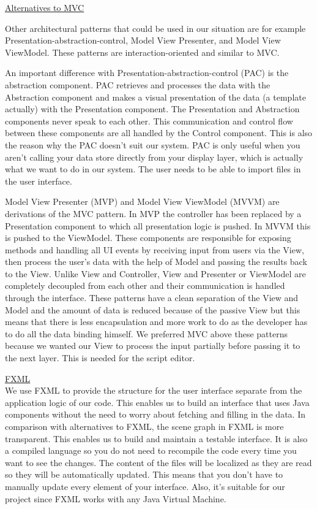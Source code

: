 \documentclass[a4paper,english,fleqn]{exam}
\begin{document}
\newpage



\underline{Alternatives to MVC}

Other architectural patterns that could be used in our situation are for example Presentation-abstraction-control, Model View Presenter, and Model View ViewModel. These patterns are interaction-oriented and similar to MVC. 

An important difference with Presentation-abstraction-control (PAC) is the abstraction component. PAC retrieves and processes the data with the Abstraction component and makes a visual presentation of the data (a template actually) with the Presentation component. The Presentation and Abstraction components never speak to each other. This communication and control flow between these components are all handled by the Control component. This is also the reason why the PAC doesn't suit our system. PAC is only useful when you aren't calling your data store directly from your display layer, which is actually what we want to do in our system. The user needs to be able to import files in the user interface. 

Model View Presenter (MVP) and Model View ViewModel (MVVM) are derivations of the MVC pattern. In MVP the controller has been replaced by a Presentation component to which all presentation logic is pushed. In MVVM this is pushed to the ViewModel. These components are responsible for exposing methods and handling all UI events by receiving input from users via the View, then process the user's data with the help of Model and passing the results back to the View. Unlike View and Controller, View and Presenter or ViewModel are completely decoupled from each other and their communication is handled through the interface. These patterns have a clean separation of the View and Model and the amount of data is reduced because of the passive View but this means that there is less encapsulation and more work to do as the developer has to do all the data binding himself. We preferred MVC above these patterns because we wanted our View to process the input partially before passing it to the next layer. This is needed for the script editor.

\underline{FXML} \\ We use FXML to provide the structure for the user interface separate from the application logic of our code. This enables us to build an interface that uses Java components without the need to worry about fetching and filling in the data. In comparison with alternatives to FXML, the scene graph in FXML is more transparent. This enables us to build and maintain a testable interface. It is also a compiled language so you do not need to recompile the code every time you want to see the changes. The content of the files will be localized as they are read so they will be automatically updated. This means that you don't have to manually update every element of your interface. Also, it's suitable for our project since FXML works with any Java Virtual Machine.  
\end{document}
